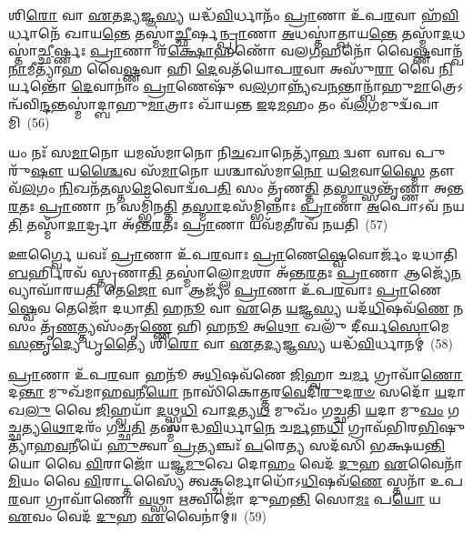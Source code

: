 {\anuvakamend[{𑌅𑌪᳴𑌹\-\ul{𑌤𑍍𑌯𑍈} 𑌤𑌸𑍍𑌮𑌾॑𑌤𑍍𑌪𑌿𑌤𑍃𑌦𑍇\-\ul{𑌵}\-𑌤𑍍𑌯᳴𑌨𑍍𑌤𑍇\-\ul{𑌨𑍈}\-𑌵 𑌨𑌵᳴𑌛\-\ul{𑌦𑌿} 𑌤\-\ul{𑌸𑍍𑌮𑌾}\-𑌥𑍍𑌸\-\ul{𑌦𑌃} 𑌪𑌞𑍍𑌚᳴𑌦𑌶 𑌚}]}%

𑌶𑌿\-\ul{𑌰𑍋} 𑌵𑌾 \ul{𑌏}\-𑌤\-\ul{𑌦𑍍𑌯}\-𑌜𑍍𑌞\-\ul{𑌸𑍍𑌯} 𑌯𑌦𑍍𑌧᳴\-\ul{𑌵𑌿}\-𑌰𑍍𑌧𑌾𑌨𑌂᳴ \ul{𑌪𑍍𑌰𑌾}\-𑌣𑌾 𑌉᳴𑌪\-\ul{𑌰}\-𑌵𑌾 𑌹᳴\-\ul{𑌵𑌿}\-𑌰𑍍𑌧𑌾𑌨𑍇᳴ 𑌖𑌾𑌯\-\ul{𑌨𑍍𑌤𑍇} 𑌤𑌸𑍍𑌮𑌾॑\-\ul{𑌚𑍍𑌛𑍀}\-𑌰𑍍\mbox{}𑌷\-\ul{𑌨𑍍𑌪𑍍𑌰𑌾}\-𑌣𑌾 \ul{𑌅}\-𑌧𑌸𑍍𑌤𑌾॑𑌤𑍍𑌖𑌾𑌯\-\ul{𑌨𑍍𑌤𑍇} 𑌤𑌸𑍍𑌮𑌾᳴\-\ul{𑌦}\-𑌧𑌸𑍍𑌤𑌾॑\-\ul{𑌚𑍍𑌛𑍀}\-𑌰𑍍𑌷𑍍𑌣𑌃 \ul{𑌪𑍍𑌰𑌾}\-𑌣𑌾 𑌰᳴\-\ul{𑌕𑍍𑌷𑍋}\-𑌹𑌣𑍋᳴ 𑌵𑌲\-\ul{𑌗}\-𑌹𑌨𑍋᳴ 𑌵𑍈\-\ul{𑌷𑍍𑌣}\-𑌵𑌾𑌨𑍍𑌖᳴\-\ul{𑌨𑌾}\-𑌮𑍀𑌤𑍍𑌯𑌾᳴𑌹 𑌵𑍈\-\ul{𑌷𑍍𑌣}\-𑌵𑌾 𑌹𑌿 \ul{𑌦𑍇}\-𑌵𑌤᳴𑌯𑍋𑌪\-\ul{𑌰}\-𑌵𑌾 𑌅𑌸𑍁᳴\-\ul{𑌰𑌾} 𑌵𑍈 \ul{𑌨𑌿}\-𑌰𑍍𑌯𑌨𑍍𑌤𑍋᳴ \ul{𑌦𑍇}\-𑌵𑌾𑌨𑌾𑌂॑ \ul{𑌪𑍍𑌰𑌾}\-𑌣𑍇𑌷𑍁᳴ 𑌵\-\ul{𑌲}\-𑌗𑌾𑌨𑍍𑌨𑍍𑌯᳴𑌖\-\ul{𑌨}\-𑌨𑍍𑌤𑌾𑌨𑍍𑌬𑌾᳴𑌹𑍁\-\ul{𑌮𑌾}\-𑌤𑍍𑌰𑍇\-𑌽𑌨𑍍𑌵᳴𑌵𑌿\-\ul{𑌨𑍍𑌦}\-𑌨𑍍𑌤𑌸𑍍𑌮𑌾॑𑌦𑍍𑌬𑌾𑌹𑍁\-\ul{𑌮𑌾}\-𑌤𑍍𑌰𑌾𑌃 𑌖𑌾᳴𑌯𑌨𑍍𑌤 \ul{𑌇}\-𑌦\-\ul{𑌮}\-𑌹𑌂 𑌤𑌂 𑌵᳴\-\ul{𑌲}\-𑌗𑌮𑍁𑌦𑍍𑌵᳴𑌪𑌾𑌮𑌿~(56)

𑌯𑌂 𑌨𑌃᳴ 𑌸\-\ul{𑌮𑌾}\-𑌨𑍋 𑌯𑌮𑌸᳴𑌮𑌾𑌨𑍋 𑌨𑌿\-\ul{𑌚}\-𑌖𑌾𑌨𑍇𑌤𑍍𑌯𑌾᳴\-\ul{𑌹} 𑌦𑍍𑌵𑍗 𑌵𑌾𑌵 𑌪𑍁𑌰𑍁᳴\-\ul{𑌷𑍗} 𑌯\-\ul{𑌶𑍍𑌚𑍈}\-𑌵 𑌸᳴\-\ul{𑌮𑌾}\-𑌨𑍋 𑌯𑌶𑍍𑌚𑌾𑌸᳴𑌮𑌾\-\ul{𑌨𑍋} 𑌯\-\ul{𑌮𑍇}\-𑌵𑌾\-\ul{𑌸𑍍𑌮𑍈} 𑌤𑍗 𑌵᳴\-\ul{𑌲}\-𑌗𑌂 \ul{𑌨𑌿}\-𑌖𑌨᳴\-\ul{𑌤}\-𑌸𑍍𑌤\-\ul{𑌮𑍇}\-𑌵𑍋𑌦𑍍𑌵᳴𑌪\-\ul{𑌤𑌿} 𑌸𑌂 𑌤𑍃᳴𑌣\-\ul{𑌤𑍍𑌤𑌿} 𑌤\-\ul{𑌸𑍍𑌮𑌾}\-𑌥𑍍𑌸𑌨𑍍𑌤𑍃᳴𑌣𑍍𑌣𑌾 𑌅𑌨𑍍𑌤\-\ul{𑌰}\-𑌤𑌃 \ul{𑌪𑍍𑌰𑌾}\-𑌣𑌾 𑌨 𑌸𑌮𑍍𑌭𑌿᳴𑌨\-\ul{𑌤𑍍𑌤𑌿} 𑌤\-\ul{𑌸𑍍𑌮𑌾}\-𑌦𑌸᳴𑌮𑍍𑌭𑌿𑌨𑍍𑌨𑌾𑌃 \ul{𑌪𑍍𑌰𑌾}\-𑌣𑌾 \ul{𑌅}\-𑌪𑍋\-𑌽𑌵᳴ 𑌨𑌯\-\ul{𑌤𑌿} 𑌤𑌸𑍍𑌮𑌾᳴\-\ul{𑌦𑌾}\-𑌰𑍍𑌦𑍍𑌰𑌾 𑌅᳴𑌨𑍍𑌤\-\ul{𑌰}\-𑌤𑌃 \ul{𑌪𑍍𑌰𑌾}\-𑌣𑌾 𑌯𑌵᳴𑌮\-\ul{𑌤𑍀}\-𑌰𑌵᳴ 𑌨𑌯𑌤𑌿~(57)

𑌊𑌰𑍍𑌗𑍍𑌵𑍈 𑌯𑌵𑌃᳴ \ul{𑌪𑍍𑌰𑌾}\-𑌣𑌾 𑌉᳴𑌪\-\ul{𑌰}\-𑌵𑌾𑌃 \ul{𑌪𑍍𑌰𑌾}\-𑌣𑍇\-\ul{𑌷𑍍𑌵𑍇}\-𑌵𑍋𑌰𑍍𑌜𑌂᳴ 𑌦𑌧𑌾𑌤𑌿 \ul{𑌬}\-𑌰𑍍\mbox{}𑌹𑌿𑌰𑌵᳴ 𑌸𑍍𑌤𑍃𑌣𑌾\-\ul{𑌤𑌿} 𑌤𑌸𑍍𑌮𑌾॑𑌲𑍍𑌲𑍋\-\ul{𑌮}\-𑌶𑌾 𑌅᳴𑌨𑍍𑌤\-\ul{𑌰}\-𑌤𑌃 \ul{𑌪𑍍𑌰𑌾}\-𑌣𑌾 𑌆𑌜𑍍𑌯𑍇᳴\-\ul{𑌨} 𑌵𑍍𑌯𑌾𑌘𑌾᳴𑌰𑌯\-\ul{𑌤𑌿} 𑌤𑍇\-\ul{𑌜𑍋} 𑌵𑌾 𑌆𑌜𑍍𑌯𑌂᳴ \ul{𑌪𑍍𑌰𑌾}\-𑌣𑌾 𑌉᳴𑌪\-\ul{𑌰}\-𑌵𑌾𑌃 \ul{𑌪𑍍𑌰𑌾}\-𑌣𑍇\-\ul{𑌷𑍍𑌵𑍇}\-𑌵 𑌤𑍇𑌜𑍋᳴ 𑌦𑌧𑌾\-\ul{𑌤𑌿} 𑌹\-\ul{𑌨𑍂} 𑌵𑌾 \ul{𑌏}\-𑌤𑍇 \ul{𑌯}\-𑌜𑍍𑌞\-\ul{𑌸𑍍𑌯} 𑌯𑌦᳴\-\ul{𑌧𑌿}\-𑌷𑌵᳴\-\ul{𑌣𑍇} 𑌨 𑌸𑌂 𑌤𑍃᳴\-\ul{𑌣}\-𑌤𑍍𑌤𑍍𑌯𑌸𑌂᳴𑌤𑍃\-\ul{𑌣𑍍𑌣𑍇} 𑌹𑌿 𑌹\-\ul{𑌨𑍂} 𑌅\-\ul{𑌥𑍋} 𑌖𑌲𑍁᳴ 𑌦𑍀𑌰𑍍𑌘\-\ul{𑌸𑍋}\-𑌮𑍇 \ul{𑌸}\-𑌨𑍍𑌤𑍃\-\ul{𑌦𑍍𑌯𑍇} 𑌧𑍃\-\ul{𑌤𑍍𑌯𑍈} 𑌶𑌿\-\ul{𑌰𑍋} 𑌵𑌾 \ul{𑌏}\-𑌤\-\ul{𑌦𑍍𑌯}\-𑌜𑍍𑌞\-\ul{𑌸𑍍𑌯} 𑌯𑌦𑍍𑌧᳴\-\ul{𑌵𑌿}\-𑌰𑍍𑌧𑌾𑌨𑌮𑍍॑~(58)

\-\ul{𑌪𑍍𑌰𑌾}\-𑌣𑌾 𑌉᳴𑌪\-\ul{𑌰}\-𑌵𑌾 𑌹𑌨𑍂᳴ 𑌅\-\ul{𑌧𑌿}\-𑌷𑌵᳴𑌣𑍇 \ul{𑌜𑌿}\-𑌹𑍍𑌵𑌾 𑌚\-\ul{𑌰𑍍𑌮} 𑌗𑍍𑌰𑌾𑌵𑌾᳴\-\ul{𑌣𑍋} 𑌦\-\ul{𑌨𑍍𑌤𑌾} 𑌮𑍁𑌖᳴𑌮𑌾𑌹\-\ul{𑌵}\-𑌨𑍀\-\ul{𑌯𑍋} 𑌨𑌾𑌸𑌿᳴𑌕𑍋𑌤𑍍𑌤𑌰\-\ul{𑌵𑍇}\-𑌦𑌿\-\ul{𑌰𑍁}\-𑌦\-\ul{𑌰}\-\-\ul{𑍞} 𑌸𑌦𑍋᳴ \ul{𑌯}\-𑌦𑌾 𑌖\-\ul{𑌲𑍁} 𑌵𑍈 \ul{𑌜𑌿}\-𑌹𑍍𑌵𑌯𑌾᳴ \ul{𑌦}\-𑌥𑍍𑌸𑍍𑌵\-\ul{𑌧𑌿} 𑌖𑌾\-\ul{𑌦}\-𑌤𑍍𑌯\-\ul{𑌥} 𑌮𑍁𑌖𑌂᳴ 𑌗𑌚𑍍𑌛𑌤𑌿 \ul{𑌯}\-𑌦𑌾 𑌮𑍁\-\ul{𑌖𑌂} 𑌗\-\ul{𑌚𑍍𑌛}\-𑌤𑍍𑌯\-\ul{𑌥𑍋}\-𑌦𑌰𑌂᳴ 𑌗𑌚𑍍𑌛\-\ul{𑌤𑌿} 𑌤𑌸𑍍𑌮𑌾॑𑌦𑍍𑌧\-\ul{𑌵𑌿}\-𑌰𑍍𑌧𑌾\-\ul{𑌨𑍇} 𑌚\-\ul{𑌰𑍍𑌮}\-𑌨𑍍𑌨\-\ul{𑌧𑌿} 𑌗𑍍𑌰𑌾𑌵᳴𑌭𑌿𑌰\-\ul{𑌭𑌿}\-𑌷𑍁𑌤𑍍𑌯𑌾᳴𑌹\-\ul{𑌵}\-𑌨𑍀𑌯𑍇᳴ \ul{𑌹𑍁}\-𑌤𑍍𑌵𑌾 \ul{𑌪𑍍𑌰}\-𑌤𑍍𑌯𑌞𑍍𑌚𑌃᳴ \ul{𑌪}\-𑌰𑍇\-\ul{𑌤𑍍𑌯} 𑌸𑌦᳴𑌸𑌿 𑌭𑌕𑍍𑌷𑌯\-\ul{𑌨𑍍𑌤𑌿} 𑌯𑍋 𑌵𑍈 \ul{𑌵𑌿}\-𑌰𑌾𑌜𑍋᳴ 𑌯𑌜𑍍𑌞\-\ul{𑌮𑍁}\-𑌖𑍇 𑌦𑍋\-\ul{𑌹𑌂} 𑌵𑍇𑌦᳴ \ul{𑌦𑍁}\-𑌹 \ul{𑌏}\-𑌵𑍈𑌨𑌾᳴\-\ul{𑌮𑌿}\-𑌯𑌂 𑌵𑍈 \ul{𑌵𑌿}\-𑌰𑌾𑌟𑍍𑌤𑌸𑍍𑌯𑍈𑌁 𑌤𑍍𑌵𑌕𑍍𑌚𑌰𑍍𑌮𑍋𑌧𑍋᳴\-𑌽\-\ul{𑌧𑌿}\-𑌷𑌵᳴\-\ul{𑌣𑍇} 𑌸𑍍𑌤𑌨𑌾᳴ 𑌉𑌪\-\ul{𑌰}\-𑌵𑌾 𑌗𑍍𑌰𑌾𑌵𑌾᳴𑌣𑍋 \ul{𑌵}\-𑌥𑍍𑌸𑌾 \ul{𑌋}\-𑌤𑍍𑌵𑌿𑌜𑍋᳴ 𑌦𑍁𑌹\-\ul{𑌨𑍍𑌤𑌿} 𑌸𑍋\-\ul{𑌮𑌃} 𑌪\-\ul{𑌯𑍋} 𑌯 \ul{𑌏}\-𑌵𑌂 𑌵𑍇𑌦᳴ \ul{𑌦𑍁}\-𑌹 \ul{𑌏}\-𑌵𑍈𑌨𑌾॑𑌮𑍍॥~(59)

